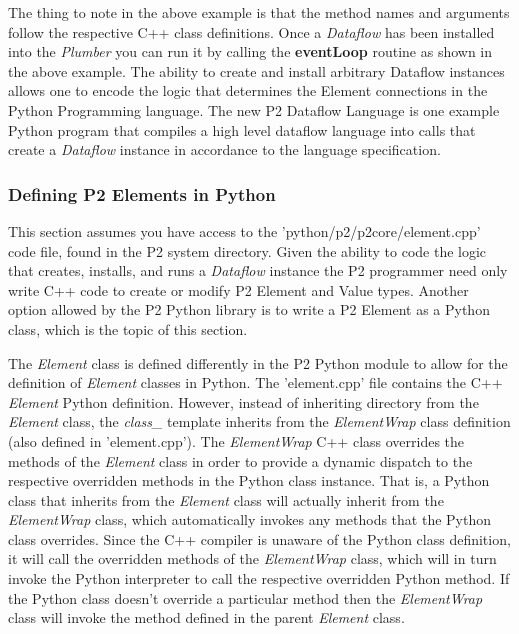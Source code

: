 \documentclass[12pt]{article}
\begin{document}
The thing to note in the above example is that the method names and arguments
follow the respective C++ class definitions. Once a \emph{Dataflow} has been installed
into the \emph{Plumber} you can run it by calling the {\bf eventLoop} routine as shown
in the above example. The ability to create and install arbitrary Dataflow instances
allows one to encode the logic that determines the Element connections in the
Python Programming language. The new P2 Dataflow Language is one example 
Python program that compiles a high level dataflow language into calls that create
a \emph{Dataflow} instance in accordance to the language specification.

\subsubsection{Defining P2 Elements in Python}

This section assumes you have access to the 'python/p2/p2core/element.cpp' code
file, found in the P2 system directory. Given the ability to code the logic that creates,
installs, and runs a \emph{Dataflow} instance the P2 programmer need only write C++ 
code to create or modify P2 Element and Value types. Another option allowed by the P2 
Python library is to write a P2 Element as a Python class, which is the topic of this 
section. 

The \emph{Element} class is defined differently in the P2 Python module to 
allow for the definition of \emph{Element} classes in Python. The 'element.cpp' file 
contains the C++ \emph{Element} Python definition. However, instead of inheriting directory from the \emph{Element} class, the \emph{class\_} template inherits
from the \emph{ElementWrap} class definition (also defined in 'element.cpp'). The
\emph{ElementWrap} C++ class overrides the methods of the \emph{Element} class
in order to provide a dynamic dispatch to the respective overridden methods in
the Python class instance. That is, a Python class that inherits from the 
\emph{Element} class will actually inherit from the \emph{ElementWrap} class, which
automatically invokes any methods that the Python class overrides. Since the C++ 
compiler is unaware of the Python class definition, it will call the 
overridden methods of the \emph{ElementWrap} class, which will in turn invoke the 
Python interpreter to call the respective overridden Python method. If the Python class 
doesn't override a particular method then the \emph{ElementWrap} class will invoke 
the method defined in the parent \emph{Element} class.
\end{document}
